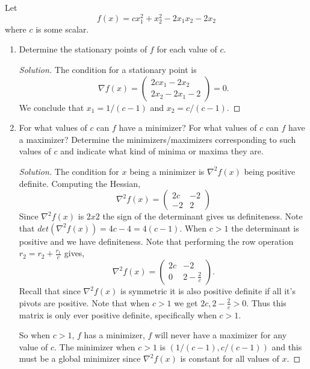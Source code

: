 \documentclass[12pt]{article}
\makeatletter
\theoremstyle{homework}
\newenvironment{exercise}[1]
{\def\@currentlabel{#1}\exercisecore}
{\endexercisecore}
\makeatother
\begin{document}
\begin{exercise}{2.10} Let 
  \begin{equation*}
    f(x) = cx_1^2 + x_2^2 - 2x_1x_2 - 2x_2
  \end{equation*}
  where $c$ is some scalar. 
  \begin{enumerate}
    \item[(i)] Determine the stationary points of $f$ for each value of $c$.
    \begin{proof}[Solution] The condition for a stationary point is 
      \begin{equation*}
        \nabla f(x) = \begin{pmatrix}
          2cx_1 - 2x_2\\
          2x_2 - 2x_1 - 2
        \end{pmatrix} = 0.
      \end{equation*}
      We conclude that $x_1 = 1/(c - 1)$ and $x_2 = c/(c - 1)$. 
    \end{proof}
    \vspace{.15in}




    \item[(ii)] For what values of $c$ can $f$ have a minimizer? For what values of $c$ can
    $f$ have a maximizer? Determine the minimizers/maximizers corresponding to such values of $c$
    and indicate what kind of minima or maxima they are.
    \begin{proof}[Solution] The condition for $x$ being a minimizer is $\nabla^2f(x)$ being positive definite. 
      Computing the Hessian, 
      \begin{equation*}
        \nabla^2 f(x) = \begin{pmatrix}
          2c & -2\\
          -2 & 2
        \end{pmatrix}
      \end{equation*}
      Since $\nabla^2 f(x)$ is $2x2$ the sign of the determinant gives us definiteness. Note that 
      $det(\nabla^2 f(x)) = 4c - 4 = 4(c - 1)$. When $c>1$ the determinant is positive and we have definiteness.
      Note that performing the row operation $r_2 = r_2 + \frac{r_1}{c}$ gives,
      \begin{equation*}
        \nabla^2 f(x) = \begin{pmatrix}
          2c & -2\\
          0 & 2 - \frac{2}{c}
        \end{pmatrix}.
      \end{equation*}
      Recall that since $\nabla^2 f(x)$ is symmetric it is also positive definite if all it's pivots are positive. Note that when $c > 1$
      we get $2c, 2 - \frac{2}{c}> 0$. Thus this matrix is only ever positive definite, specifically when $c > 1$.

      So when $c > 1$, $f$ has a minimizer, $f$ will never have a maximizer for any value of $c$. The minimizer when $c > 1$ is $(1/(c - 1), c/(c - 1))$
      and this must be a global minimizer since $\nabla^2 f(x)$ is constant for all values of $x$. 
    \end{proof}
    \end{enumerate}
\end{exercise}
\end{document}

